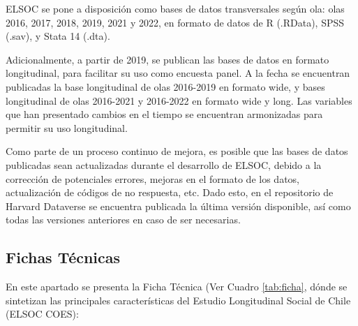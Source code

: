 \documentclass[
  12pt,
]{article}
\begin{document}
ELSOC se pone a disposición como bases de datos transversales según ola: olas 2016, 2017, 2018, 2019, 2021 y 2022, en formato de datos de R (.RData), SPSS (.sav), y Stata 14 (.dta).

Adicionalmente, a partir de 2019, se publican las bases de datos en formato longitudinal, para facilitar su uso como encuesta panel. A la fecha se encuentran publicadas la base longitudinal de olas 2016-2019 en formato wide, y bases longitudinal de olas 2016-2021 y 2016-2022 en formato wide y long. Las variables que han presentado cambios en el tiempo se encuentran armonizadas para permitir su uso longitudinal.

Como parte de un proceso continuo de mejora, es posible que las bases de datos publicadas sean actualizadas durante el desarrollo de ELSOC, debido a la corrección de potenciales errores, mejoras en el formato de los datos, actualización de códigos de no respuesta, etc. Dado esto, en el repositorio de Harvard Dataverse se encuentra publicada la última versión disponible, así como todas las versiones anteriores en caso de ser necesarias.

\hypertarget{fichas-tuxe9cnicas}{%
\subsection{Fichas Técnicas}\label{fichas-tuxe9cnicas}}

En este apartado se presenta la Ficha Técnica (Ver Cuadro \ref{tab:ficha}, dónde se sintetizan las principales características del Estudio Longitudinal Social de Chile (ELSOC COES):
\end{document}
